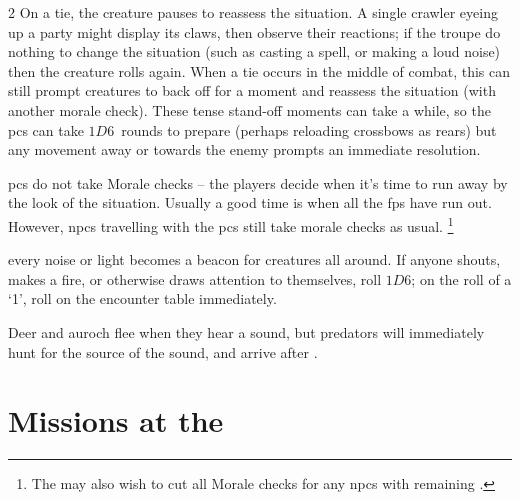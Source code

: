 \begin{multicols}{2}
On a tie, the creature pauses to reassess the situation.
A single \gls{crawler} eyeing up a party might display its claws, then observe their reactions; if the troupe do nothing to change the situation (such as casting a spell, or making a loud noise) then the creature rolls again.
When a tie occurs in the middle of combat, this can still prompt creatures to back off for a moment and reassess the situation (with another morale check).
These tense stand-off moments can take a while, so the \glspl{pc} can take $1D6$~\glspl{round} to prepare (perhaps reloading crossbows as  rears)
but any movement away or towards the enemy prompts an immediate resolution.

\Glspl{pc} do not take Morale checks -- the players decide when it's time to run away by the look of the situation.
Usually a good time is when all the \glspl{fp} have run out.
%
However, \glspl{npc} travelling with the \glspl{pc} still take morale checks as usual.%
\footnote{The  may also wish to cut all Morale checks for any \glspl{npc} with remaining .}%

every noise or light becomes a beacon for creatures all around.
If anyone shouts, makes a fire, or otherwise draws attention to themselves, roll $1D6$; on the roll of a `1', roll on the encounter table immediately.

Deer and auroch flee when they hear a sound, but predators will immediately hunt for the source of the sound, and arrive after .

\end{multicols}

\setCycle{\month}{\day}

\section{Missions at the }
\label{NGmissions}

